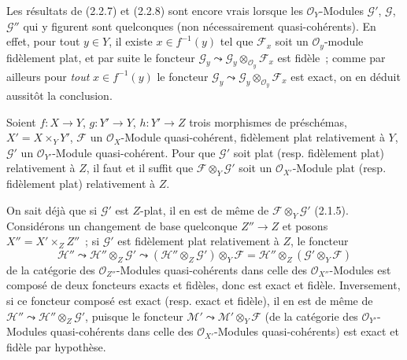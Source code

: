 \begin{remark}[2.2.9]
\label{IV.2.2.9-fr}
Les résultats de (2.2.7) et (2.2.8) sont encore vrais lorsque les
$\mathcal O_Y$-Modules $\mathscr G'$, $\mathscr G$, $\mathscr G''$ qui y
figurent sont quelconques (non nécessairement quasi-cohérents). En effet,
pour tout $y\in Y$, il existe $x\in f^{-1}(y)$ tel que $\mathscr F_x$ soit un
$\mathcal O_y$-module
fidèlement plat, et par suite le foncteur
$\mathscr G_y\leadsto\mathscr G_y\otimes_{\mathcal O_y}\mathscr F_x$ est
fidèle~; comme par ailleurs pour \emph{tout} $x\in f^{-1}(y)$ le foncteur
$\mathscr G_y\leadsto\mathscr G_y\otimes_{\mathcal O_y}\mathscr F_x$ est
exact, on en déduit aussitôt la conclusion.
\end{remark}

\begin{proposition}[2.2.10]
\label{IV.2.2.10-fr}
Soient $f:X\to Y$, $g:Y'\to Y$, $h:Y'\to Z$ trois morphismes de préschémas,
$X'=X\times_Y Y'$, $\mathscr F$ un $\mathcal O_X$-Module quasi-cohérent,
fidèlement plat relativement à $Y$, $\mathscr G'$ un
$\mathcal O_{Y'}$-Module quasi-cohérent. Pour que $\mathscr G'$ soit plat
\textup{(resp.} fidèlement plat) relativement à $Z$, il faut et il suffit que
$\mathscr F\otimes_Y\mathscr G'$ soit un $\mathcal O_{X'}$-Module plat
\textup{(resp.} fidèlement plat) relativement à $Z$.
\end{proposition}

On sait déjà que si $\mathscr G'$ est $Z$-plat, il en est de même de
$\mathscr F\otimes_Y\mathscr G'$ (2.1.5). Considérons un changement de base
quelconque $Z''\to Z$ et posons $X''=X'\times_Z Z''$~; si $\mathscr G'$ est
fidèlement plat relativement à $Z$, le foncteur
\begin{equation}
\tag{2.2.10.1}
\label{IV.2.2.10.1-fr}
\mathscr H''\leadsto\mathscr H''\otimes_Z\mathscr G'
\leadsto(\mathscr H''\otimes_Z\mathscr G')\otimes_Y\mathscr F
=\mathscr H''\otimes_Z(\mathscr G'\otimes_Y\mathscr F)
\end{equation}
de la catégorie des $\mathcal O_{Z''}$-Modules quasi-cohérents dans celle des
$\mathcal O_{X''}$-Modules est composé de deux foncteurs exacts et fidèles,
donc est exact et fidèle. Inversement, si ce foncteur composé est exact (resp.
exact et fidèle), il en est de même de
$\mathscr H''\leadsto\mathscr H''\otimes_Z\mathscr G'$, puisque le foncteur
$\mathscr M'\leadsto\mathscr M'\otimes_Y\mathscr F$ (de la catégorie des
$\mathcal O_{Y'}$-Modules quasi-cohérents dans celle des
$\mathcal O_{X'}$-Modules quasi-cohérents) est exact et fidèle par hypothèse.

